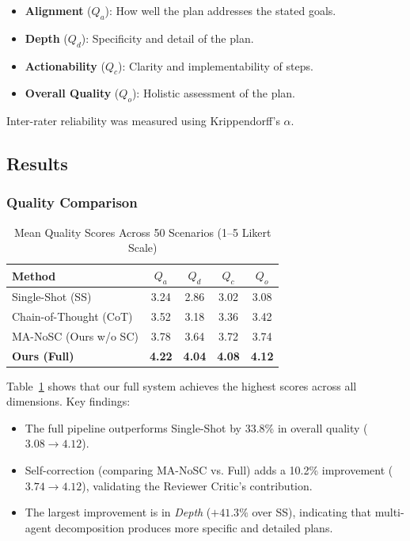\documentclass[journal]{IEEEtran}
\begin{document}
\begin{itemize}
    \item \textbf{Alignment} ($Q_a$): How well the plan addresses the stated goals.
    \item \textbf{Depth} ($Q_d$): Specificity and detail of the plan.
    \item \textbf{Actionability} ($Q_c$): Clarity and implementability of steps.
    \item \textbf{Overall Quality} ($Q_o$): Holistic assessment of the plan.
\end{itemize}

Inter-rater reliability was measured using Krippendorff's $\alpha$.

\subsection{Results}

\subsubsection{Quality Comparison}

\begin{table}[!t]
    \centering
    \caption{Mean Quality Scores Across 50 Scenarios (1--5 Likert Scale)}
    \label{tab:results}
    \begin{tabular}{@{}lcccc@{}}
        \toprule
        \textbf{Method} & $Q_a$ & $Q_d$ & $Q_c$ & $Q_o$ \\
        \midrule
        Single-Shot (SS) & 3.24 & 2.86 & 3.02 & 3.08 \\
        Chain-of-Thought (CoT) & 3.52 & 3.18 & 3.36 & 3.42 \\
        MA-NoSC (Ours w/o SC) & 3.78 & 3.64 & 3.72 & 3.74 \\
        \textbf{Ours (Full)} & \textbf{4.22} & \textbf{4.04} & \textbf{4.08} & \textbf{4.12} \\
        \bottomrule
    \end{tabular}
\end{table}

Table~\ref{tab:results} shows that our full system achieves the highest scores across all dimensions. Key findings:

\begin{itemize}
    \item The full pipeline outperforms Single-Shot by 33.8\% in overall quality ($3.08 \rightarrow 4.12$).
    \item Self-correction (comparing MA-NoSC vs. Full) adds a 10.2\% improvement ($3.74 \rightarrow 4.12$), validating the Reviewer Critic's contribution.
    \item The largest improvement is in \textit{Depth} ($+41.3\%$ over SS), indicating that multi-agent decomposition produces more specific and detailed plans.
\end{itemize}
\end{document}
